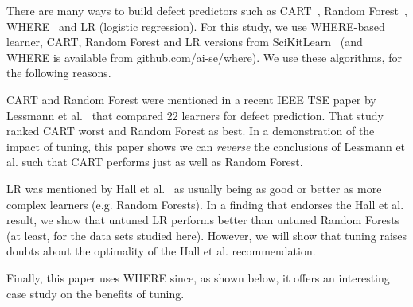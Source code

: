\documentclass{sig-alternative}
\begin{document}
There are many ways to build defect predictors
such as  CART~\cite{brieman00}, Random Forest~\cite{breiman84}, 
 WHERE~\cite{menzies2013local} and LR (logistic regression).
For this study, we use WHERE-based learner, CART, Random Forest and LR versions  from 
SciKitLearn~\cite{scikit-learn} (and
WHERE is available from
github.com/ai-se/where). 
 We use  these algorithms, for the following reasons.
 
CART and Random Forest were mentioned in
a recent IEEE TSE paper by Lessmann et al.~\cite{lessmann2008benchmarking} that compared 22  
learners for  defect prediction.
That study ranked  CART  worst  and Random Forest as best.
In a demonstration of the impact of tuning,
this paper shows  we can {\em reverse} the conclusions of  Lessmann et al. such that CART
performs just as well as
 Random Forest.

LR was  mentioned by Hall et al.~\cite{hall11}
as usually being as good or better as more complex learners (e.g.
Random Forests). In a finding that endorses the Hall et al. result,
we show that untuned LR performs better than 
untuned Random Forests (at least, for the data sets studied here). However,
we will show that tuning raises doubts about the optimality of the
Hall et al. recommendation.

Finally,  this
 paper uses WHERE since, as shown below,
it offers an interesting case study on the benefits of tuning.

  
\end{document}
